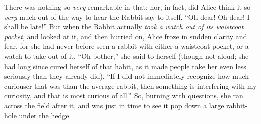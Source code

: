 There was nothing so \emph{very} remarkable in that; nor, in fact, did Alice think it so \emph{very} much out of the way to hear the Rabbit say to itself, “Oh dear! Oh dear! I shall be late!” But when the Rabbit actually \emph{took a watch out of its waistcoat pocket,} and looked at it, and then hurried on, Alice froze in sudden clarity and fear, for she had never before seen a rabbit with either a waistcoat pocket, or a watch to take out of it. “Oh bother,” she said to herself (though not aloud; she had long since cured herself of that habit, as it made people take her even less seriously than they already did). “If I did not immediately recognize how much curiouser that was than the average rabbit, then something is interfering with my curiosity, and that is most curious of all.” So, burning with questions, she ran across the field after it, and was just in time to see it pop down a large rabbit-hole under the hedge.


